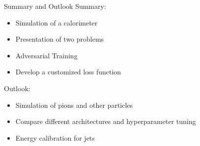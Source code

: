 \documentclass[10pt]{beamer}
\begin{document}
\begin{frame}{Summary and Outlook}
    Summary:
  \begin{itemize}
  \item Simulation of a calorimeter
  \item Presentation of two problems
  \item Adversarial Training
  \item Develop a customized loss function
  \end{itemize}
  Outlook:
  \begin{itemize}
  \item Simulation of pions and other particles
  \item Compare different architectures and hyperparameter tuning
  \item Energy calibration for jets
  \end{itemize}
\end{frame}
\end{document}
